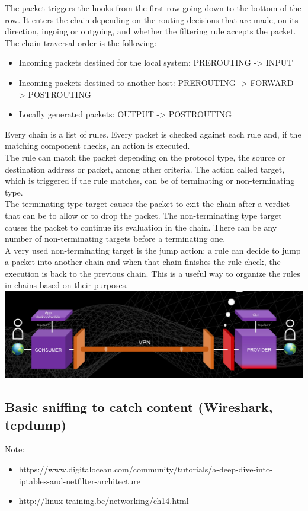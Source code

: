 \documentclass[]{article}
\begin{document}
	The packet triggers the hooks from the first row going down to the bottom of the row. It enters the chain depending on the routing decisions that are made, on its direction, ingoing or outgoing, and whether the filtering rule accepts the packet.\\

	The chain traversal order is the following:
	\begin{itemize}
		\item Incoming packets destined for the local system: PREROUTING -> INPUT
		\item Incoming packets destined to another host: PREROUTING -> FORWARD -> POSTROUTING
		\item Locally generated packets: OUTPUT -> POSTROUTING
	\end{itemize}
	

	Every chain is a list of rules. Every packet is checked against each rule and, if the matching component checks, an action is executed.\\
	The rule can match the packet depending on the protocol type, the source or destination address or packet, among other criteria.
	The action called target, which is triggered if the rule matches, can be of terminating or non-terminating type.\\
	The terminating type target causes the packet to exit the chain after a verdict that can be to allow or to drop the packet.
	The non-terminating type target causes the packet to continue its evaluation in the chain. There can be any number of non-terminating targets before a terminating one.\\
	A very used non-terminating target is the jump action: a rule can decide to jump a packet into another chain and when that chain finishes the rule check, the execution is back to the previous chain. This is a useful way to organize the rules in chains based on their purposes.\\


	\includegraphics[width=\linewidth]{"images/client_server_vpn_connection.png"}

	\subsection{Basic sniffing to catch content (Wireshark, tcpdump)}
	Note:
	\begin{itemize}
		\item https://www.digitalocean.com/community/tutorials/a-deep-dive-into-iptables-and-netfilter-architecture
		\item http://linux-training.be/networking/ch14.html
	\end{itemize}
	
\end{document}
